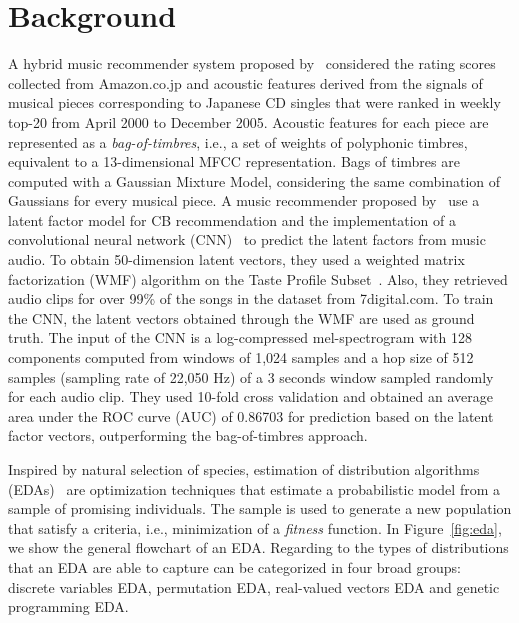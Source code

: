 \documentclass{article}
\begin{document}
\section{Background}
\label{sec:background}

A hybrid music recommender system proposed by~\cite{Yoshii2008435} considered the rating scores collected from Amazon.co.jp and acoustic features derived from the signals of musical pieces corresponding to Japanese CD singles that were ranked in weekly top-20 from April 2000 to December 2005. Acoustic features for each piece are represented as a \textit{bag-of-timbres}, i.e., a set of weights of polyphonic timbres, equivalent to a 13-dimensional MFCC representation. Bags of timbres are computed with a Gaussian Mixture Model, considering the same combination of Gaussians for every musical piece. A music recommender proposed by~\cite{NIPS2013_5004} use a latent factor model for CB recommendation and the implementation of a convolutional neural network (CNN)~\cite{Bengio-et-al-2015-Book} to predict the latent factors from music audio. To obtain 50-dimension latent vectors, they used a weighted matrix factorization (WMF) algorithm on the Taste Profile Subset~\cite{Bertin-Mahieux2011}. Also, they retrieved audio clips for over 99\% of the songs in the dataset from 7digital.com. To train the CNN, the latent vectors obtained through the WMF are used as ground truth. The input of the CNN is a log-compressed mel-spectrogram with 128 components computed from windows of 1,024 samples and a hop size of 512 samples (sampling rate of 22,050 Hz) of a 3 seconds window sampled randomly for each audio clip. They used 10-fold cross validation and obtained an average area under the ROC curve (AUC) of 0.86703 for prediction based on the latent factor vectors, outperforming the bag-of-timbres approach.

Inspired by natural selection of species, estimation of distribution algorithms (EDAs)~\cite{pelikan2015estimation, Ding2015451, Santana:Bielza:Larrañaga:Lozano:Echegoyen:Mendiburu:Armañanzas:Shakya:2009:JSSOBK:v35i07} are optimization techniques that estimate a probabilistic model from a sample of promising individuals. The sample is used to generate a new population that satisfy a criteria, i.e., minimization of a \textit{fitness} function. In Figure~\ref{fig:eda}, we show the general flowchart of an EDA. Regarding to the types of distributions that an EDA are able to capture can be categorized in four broad groups: discrete variables EDA, permutation EDA, real-valued vectors EDA and genetic programming EDA.
\end{document}
